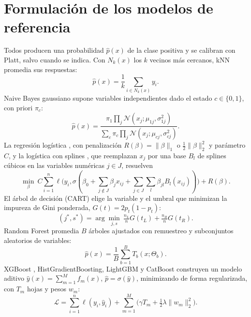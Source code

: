 \documentclass[11pt,a4paper]{article}
\begin{document}
\section{Formulación de los modelos de referencia}\label{app:baselines}
Todos producen una probabilidad $\hat p(x)$ de la clase positiva y se calibran con Platt, salvo cuando se indica. Con $N_k(x)$ los $k$ vecinos más cercanos, kNN \cite{cover1967} promedia sus respuestas:
\begin{equation}\hat p(x)=\frac1k\sum_{i\in N_k(x)}y_i.\label{eq:knn}\end{equation}
Naive Bayes gaussiano \cite{domingos1997} supone variables independientes dado el estado $c\in\{0,1\}$, con priori $\pi_c$:
\begin{equation}\hat p(x)=\frac{\pi_1\prod_j\mathcal N(x_j;\mu_{1j},\sigma_{1j}^2)}{\sum_{c}\pi_c\prod_j\mathcal N(x_j;\mu_{cj},\sigma_{cj}^2)}.\label{eq:nb}\end{equation}
La regresión logística \cite{hosmer2013}, con penalización $R(\beta)=\|\beta\|_1$ o $\tfrac12\|\beta\|_2^2$ y parámetro $C$, y la logística con splines \cite{eilers1996}, que reemplazan $x_j$ por una base $B_l$ de splines cúbicos en las variables numéricas $j\in J$, resuelven
\begin{equation}\min_{\beta}\ C\sum_{i=1}^n\ell\big(y_i,\sigma(\beta_0+\textstyle\sum_{j\notin J}\beta_jx_{ij}+\sum_{j\in J}\sum_l\beta_{jl}B_l(x_{ij}))\big)+R(\beta).\label{eq:lr}\end{equation}
El árbol de decisión (CART) \cite{breiman1984} elige la variable y el umbral que minimizan la impureza de Gini ponderada, $G(t)=2p_t(1-p_t)$:
\begin{equation}(j^*,s^*)=\arg\min_{j,s}\ \tfrac{n_L}{n}G(t_L)+\tfrac{n_R}{n}G(t_R).\label{eq:cart}\end{equation}
Random Forest \cite{breiman2001} promedia $B$ árboles ajustados con remuestreo y subconjuntos aleatorios de variables:
\begin{equation}\hat p(x)=\frac1B\sum_{b=1}^BT_b(x;\Theta_b).\label{eq:rf}\end{equation}
XGBoost \cite{chen2016}, HistGradientBoosting, LightGBM \cite{ke2017} y CatBoost \cite{prokhorenkova2018} construyen un modelo aditivo $\hat y(x)=\sum_{m=1}^{M}f_m(x)$, $\hat p=\sigma(\hat y)$, minimizando de forma regularizada, con $T_m$ hojas y pesos $w_m$:
\begin{equation}\mathcal L=\sum_{i=1}^n\ell(y_i,\hat y_i)+\sum_{m=1}^M\Big(\gamma T_m+\tfrac12\lambda\|w_m\|_2^2\Big).\label{eq:gb}\end{equation}
\end{document}

